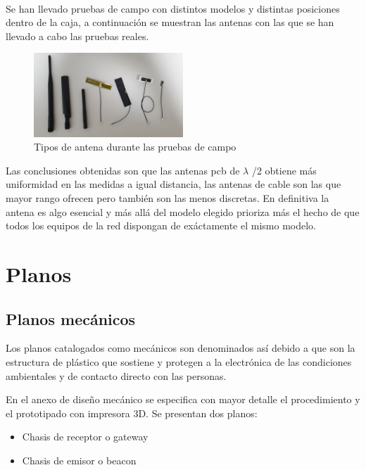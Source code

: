 \documentclass[a4paper ,12pt, onecolumn]{article}
\begin{document}
            \paragraph{}
            Se han llevado pruebas de campo con distintos modelos y distintas posiciones dentro de la caja, a continuación se muestran las 
            antenas con las que se han llevado a cabo las pruebas reales.
            \begin{center}
                \begin{figure}[ht]
                    \centering
                    \includegraphics[width=0.5\textwidth]{antennas_variety.jpeg}
                    \caption{Tipos de antena durante las pruebas de campo}
                    \label{fig:mesh11}
                \end{figure}
            \end{center}
            Las conclusiones obtenidas son que las antenas pcb de $\lambda$ /2 obtiene más uniformidad en las medidas a igual distancia, las 
            antenas de cable son las que mayor rango ofrecen pero también son las menos discretas. En definitiva la antena es algo esencial y más 
            allá del modelo elegido prioriza más el hecho de que todos los equipos de la red dispongan de exáctamente el mismo modelo.
            

\section{Planos}
    \subsection{Planos mecánicos}
        Los planos catalogados como mecánicos son denominados así debido a que son la estructura de plástico
        que sostiene y protegen a la electrónica de las condiciones ambientales y de contacto directo con las 
        personas.

        En el anexo de diseño mecánico se especifica con mayor detalle el procedimiento y el prototipado con impresora
        3D. Se presentan dos planos:
        \begin{itemize}
            \item Chasis de receptor o gateway
            \item Chasis de emisor o beacon
        \end{itemize}
\end{document}
